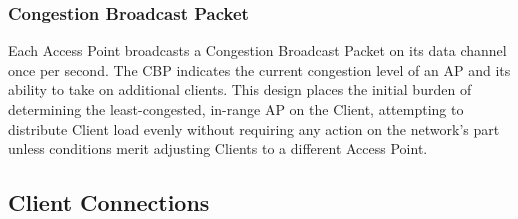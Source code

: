 \documentclass[11pt,twocolumn]{article}
\begin{document}
\subsubsection{Congestion Broadcast Packet}
\indent Each Access Point broadcasts a Congestion Broadcast Packet on its data channel once per second. The CBP indicates the current congestion level of an AP and its ability to take on additional clients. This design places the initial burden of determining the least-congested, in-range AP on the Client, attempting to distribute Client load evenly without requiring any action on the network's part unless conditions merit adjusting Clients to a different Access Point.

\subsection{Client Connections}
\end{document}
